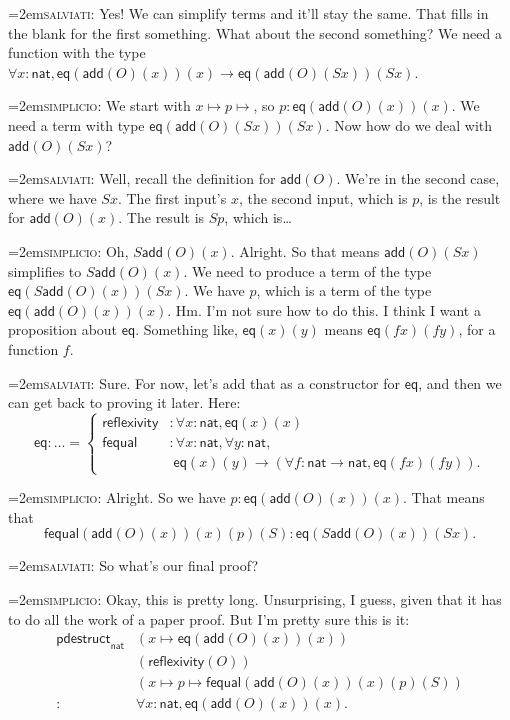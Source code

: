 \documentclass[11pt,paper=letter]{scrartcl}
\newcommand{\sf}{\mathsf}
\newcommand{\simp}{\vspace{0.5em}\noindent\hangindent=2em\textsc{simplicio:} }
\newcommand{\salv}{\vspace{0.5em}\noindent\hangindent=2em\textsc{salviati:} }
\begin{document}
\salv Yes! We can simplify terms and it'll stay the same. That fills in the blank for the first something. What about the second something? We need a function with the type $\forall x: \sf{nat}, \sf{eq}(\sf{add}(O)(x))(x) \to \sf{eq}(\sf{add}(O)(Sx))(Sx)$.

\simp We start with $x \mapsto p \mapsto$, so $p : \sf{eq}(\sf{add}(O)(x))(x)$. We need a term with type $\sf{eq}(\sf{add}(O)(Sx))(Sx)$. Now how do we deal with $\sf{add}(O)(Sx)$?

\salv Well, recall the definition for $\sf{add}(O)$. We're in the second case, where we have $Sx$. The first input's $x$, the second input, which is $p$, is the result for $\sf{add}(O)(x)$. The result is $Sp$, which is\dots

\simp Oh, $S\sf{add}(O)(x)$. Alright. So that means $\sf{add}(O)(Sx)$ simplifies to $S\sf{add}(O)(x)$. We need to produce a term of the type $\sf{eq}(S\sf{add}(O)(x))(Sx)$. We have $p$, which is a term of the type $\sf{eq}(\sf{add}(O)(x))(x)$. Hm. I'm not sure how to do this. I think I want a proposition about $\sf{eq}$. Something like, $\sf{eq}(x)(y)$ means $\sf{eq}(fx)(fy)$, for a function $f$.

\salv Sure. For now, let's add that as a constructor for $\sf{eq}$, and then we can get back to proving it later. Here: \[
\sf{eq}: \dots =
  \begin{cases}
  \sf{reflexivity}&: \forall x: \sf{nat}, \sf{eq}(x)(x)\\
  \sf{fequal}&: \forall x: \sf{nat}, \forall y: \sf{nat},\\
  &\;\sf{eq}(x)(y) \to (\forall f: \sf{nat} \to \sf{nat}, \sf{eq}(fx)(fy)).
  \end{cases}
\]

\simp Alright. So we have $p : \sf{eq}(\sf{add}(O)(x))(x)$. That means that \[
\sf{fequal}(\sf{add}(O)(x))(x)(p)(S) : \sf{eq}(S\sf{add}(O)(x))(Sx).\]

\salv So what's our final proof?

\simp Okay, this is pretty long. Unsurprising, I guess, given that it has to do all the work of a paper proof. But I'm pretty sure this is it:
\begin{align*}
  \sf{pdestruct}_\sf{nat}
  &(x \mapsto \sf{eq}(\sf{add}(O)(x))(x))\\
  &(\sf{reflexivity}(O))\\
  &(x \mapsto p \mapsto \sf{fequal}(\sf{add}(O)(x))(x)(p)(S))\\
  :\,& \forall x: \sf{nat}, \sf{eq}(\sf{add}(O)(x))(x).
\end{align*}
\end{document}
